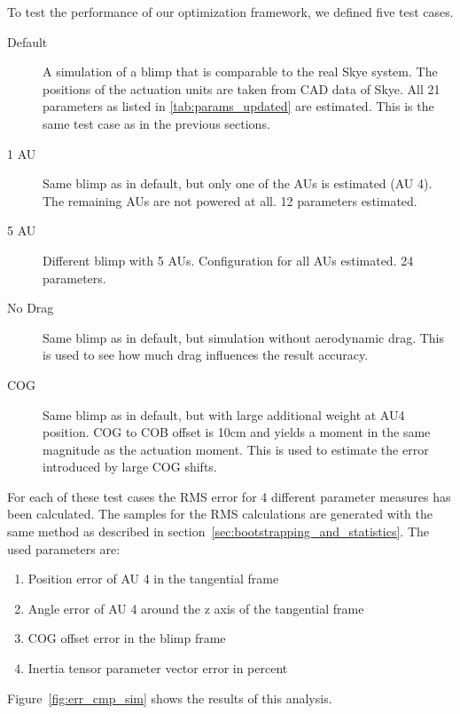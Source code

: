 To test the performance of our optimization framework, we defined five test cases.
\begin{description}
\item[Default] A simulation of a blimp that is comparable to the real Skye system. The positions of the actuation units are taken from CAD data of Skye. All 21 parameters as listed in \cref{tab:params_updated} are estimated. This is the same test case as in the previous sections.
\item[1 AU] Same blimp as in default, but only one of the AUs is estimated (AU 4). The remaining AUs are not powered at all. 12 parameters estimated.
\item[5 AU] Different blimp with 5 AUs. Configuration for all AUs estimated. 24 parameters.
\item[No Drag] Same blimp as in default, but simulation without aerodynamic drag. This is used to see how much drag influences the result accuracy.
\item[COG] Same blimp as in default, but with large additional weight at AU4 position. COG to COB offset is 10cm and yields a moment in the same magnitude as the actuation moment. This is used to estimate the error introduced by large COG shifts.
\end{description}

For each of these test cases the RMS error for 4 different parameter measures has been calculated.
The samples for the RMS calculations are generated with the same method as described in section~\ref{sec:bootstrapping_and_statistics}.
The used parameters are:
\begin{enumerate}
\item Position error of AU 4 in the tangential frame
\item Angle error of AU 4 around the z axis of the tangential frame
\item COG offset error in the blimp frame
\item Inertia tensor parameter vector error in percent
\end{enumerate}

Figure~\ref{fig:err_cmp_sim} shows the results of this analysis.

